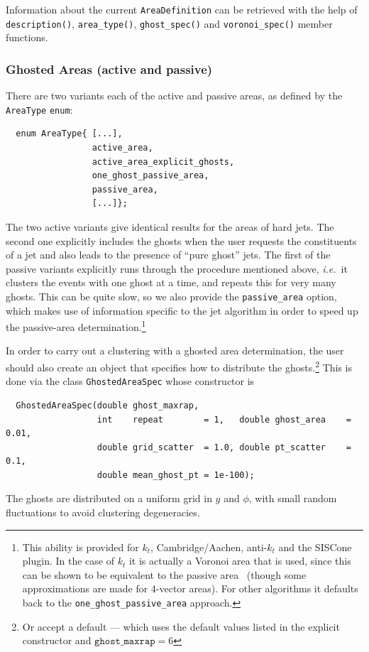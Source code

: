 \documentclass[12pt,a4]{article}
\newcommand{\ttt}[1]{{\small\texttt{#1}}}
\newcommand{\ie}{{\it i.e.}\ }
\begin{document}
Information about the current \ttt{AreaDefinition} can be retrieved
with the help of \ttt{description()}, \ttt{area\_type()},
\ttt{ghost\_spec()} and \ttt{voronoi\_spec()} member functions.

\subsubsection{Ghosted Areas (active and passive)}
\label{sec:ghosted-areas}

There are two variants each of the active and passive areas, as
defined by the \ttt{AreaType} \ttt{enum}:
\begin{lstlisting}
  enum AreaType{ [...],
                 active_area, 
                 active_area_explicit_ghosts,
                 one_ghost_passive_area, 
                 passive_area, 
                 [...]};
\end{lstlisting}
The two active variants give identical results for the areas of hard
jets.
%
The second one explicitly includes the ghosts when the user requests
the constituents of a jet and also leads to the presence of ``pure
ghost'' jets.
%
The first of the passive variants
explicitly runs through the procedure mentioned above, \ie it clusters
the events with one ghost at a time, and repeats this for very many
ghosts. This can be quite slow, so we also provide the
\ttt{passive\_area} option, which makes use of information specific to
the jet algorithm in order to speed up the passive-area
determination.\footnote{This ability is provided for $k_t$,
  Cambridge/Aachen, anti-$k_t$ and the SISCone plugin. In the case of
  $k_t$ it is actually a Voronoi area that is used, since this can be
  shown to be equivalent to the passive area~\cite{CSSAreas} (though
  some approximations are made for 4-vector areas). 
  For other algorithms it defaults back to the
  \texttt{one\_ghost\_passive\_area} approach.}

In order to carry out a clustering with a ghosted area determination,
the user should also create an object that specifies how to distribute
the ghosts.\footnote{Or accept a default --- which uses the default
  values listed in the explicit constructor and $\texttt{ghost\_maxrap} =
  6$} %
This is done via the class \ttt{GhostedAreaSpec} whose
constructor is
\begin{lstlisting}
  GhostedAreaSpec(double ghost_maxrap, 
                  int    repeat        = 1,   double ghost_area    = 0.01, 
                  double grid_scatter  = 1.0, double pt_scatter    = 0.1,
                  double mean_ghost_pt = 1e-100);
\end{lstlisting}
The ghosts are distributed on a uniform grid in $y$ and $\phi$, with
small random fluctuations to avoid clustering degeneracies.
\end{document}
